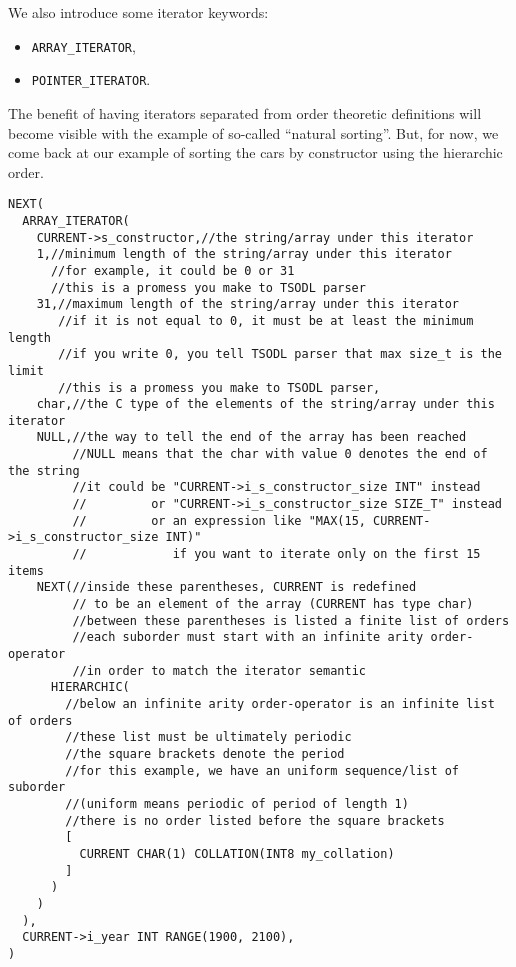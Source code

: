 \documentclass[a4paper,11pt]{report}
\begin{document}
We also introduce some iterator keywords:
\begin{itemize}
\item \verb?ARRAY_ITERATOR?,
\item \verb?POINTER_ITERATOR?.
\end{itemize}
The benefit of having iterators separated from order theoretic definitions will become visible
with the example of so-called ``natural sorting''.
But, for now, we come back at our example of sorting the cars by constructor using the hierarchic order.


\begin{verbatim}
NEXT(
  ARRAY_ITERATOR(
    CURRENT->s_constructor,//the string/array under this iterator
    1,//minimum length of the string/array under this iterator
      //for example, it could be 0 or 31
      //this is a promess you make to TSODL parser
    31,//maximum length of the string/array under this iterator
       //if it is not equal to 0, it must be at least the minimum length
       //if you write 0, you tell TSODL parser that max size_t is the limit
       //this is a promess you make to TSODL parser,
    char,//the C type of the elements of the string/array under this iterator
    NULL,//the way to tell the end of the array has been reached
         //NULL means that the char with value 0 denotes the end of the string
         //it could be "CURRENT->i_s_constructor_size INT" instead
         //         or "CURRENT->i_s_constructor_size SIZE_T" instead
         //         or an expression like "MAX(15, CURRENT->i_s_constructor_size INT)"
         //            if you want to iterate only on the first 15 items
    NEXT(//inside these parentheses, CURRENT is redefined
         // to be an element of the array (CURRENT has type char)
         //between these parentheses is listed a finite list of orders
         //each suborder must start with an infinite arity order-operator
         //in order to match the iterator semantic
      HIERARCHIC(
        //below an infinite arity order-operator is an infinite list of orders
        //these list must be ultimately periodic
        //the square brackets denote the period
        //for this example, we have an uniform sequence/list of suborder
        //(uniform means periodic of period of length 1)
        //there is no order listed before the square brackets
        [
          CURRENT CHAR(1) COLLATION(INT8 my_collation)
        ]
      )
    )
  ),
  CURRENT->i_year INT RANGE(1900, 2100),
)
\end{verbatim}
\end{document}
